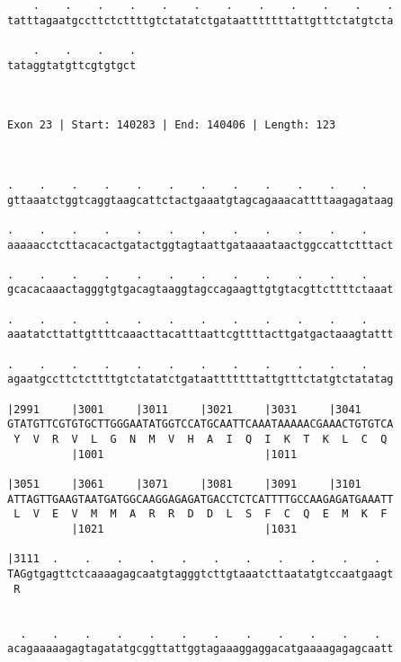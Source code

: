 \documentclass{article}
\begin{document}
\begin{Verbatim}
    .    .    .    .    .    .    .    .    .    .    .    .
tatttagaatgccttctcttttgtctatatctgataatttttttattgtttctatgtcta
                                                            
    .    .    .    .
tataggtatgttcgtgtgct
                    
                    
 
Exon 23 | Start: 140283 | End: 140406 | Length: 123



.    .    .    .    .    .    .    .    .    .    .    .    
gttaaatctggtcaggtaagcattctactgaaatgtagcagaaacattttaagagataag
                                                            
.    .    .    .    .    .    .    .    .    .    .    .    
aaaaacctcttacacactgatactggtagtaattgataaaataactggccattctttact
                                                            
.    .    .    .    .    .    .    .    .    .    .    .    
gcacacaaactagggtgtgacagtaaggtagccagaagttgtgtacgttcttttctaaat
                                                            
.    .    .    .    .    .    .    .    .    .    .    .    
aaatatcttattgttttcaaacttacatttaattcgttttacttgatgactaaagtattt
                                                            
.    .    .    .    .    .    .    .    .    .    .    .    
agaatgccttctcttttgtctatatctgataatttttttattgtttctatgtctatatag
                                                            
|2991     |3001     |3011     |3021     |3031     |3041     
GTATGTTCGTGTGCTTGGGAATATGGTCCATGCAATTCAAATAAAAACGAAACTGTGTCA
 Y  V  R  V  L  G  N  M  V  H  A  I  Q  I  K  T  K  L  C  Q 
          |1001                         |1011               
  
|3051     |3061     |3071     |3081     |3091     |3101     
ATTAGTTGAAGTAATGATGGCAAGGAGAGATGACCTCTCATTTTGCCAAGAGATGAAATT
 L  V  E  V  M  M  A  R  R  D  D  L  S  F  C  Q  E  M  K  F 
          |1021                         |1031               
  
|3111  .    .    .    .    .    .    .    .    .    .    .  
TAGgtgagttctcaaaagagcaatgtagggtcttgtaaatcttaatatgtccaatgaagt
 R                                                          
                                                            
  
  .    .    .    .    .    .    .    .    .    .    .    .  
acagaaaaagagtagatatgcggttattggtagaaaggaggacatgaaaagagagcaatt
                                                            

\end{Verbatim}
\end{document}
